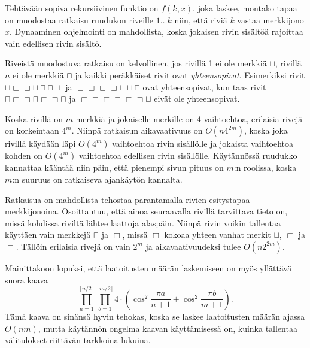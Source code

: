Tehtävään sopiva rekursiivinen funktio on $f(k,x)$,
joka laskee, montako tapaa on muodostaa ratkaisu
ruudukon riveille $1 \ldots k$ niin,
että riviä $k$ vastaa merkkijono $x$.
Dynaaminen ohjelmointi on mahdollista,
koska jokaisen rivin sisältöä
rajoittaa vain edellisen rivin sisältö.

Riveistä muodostuva ratkaisu on kelvollinen,
jos rivillä 1 ei ole merkkiä $\sqcup$,
rivillä $n$ ei ole merkkiä $\sqcap$
ja kaikki peräkkäiset rivit ovat \emph{yhteensopivat}.
Esimerkiksi rivit
$\sqcup \sqsubset \sqsupset \sqcup \sqcap \sqcap \sqcup$ ja
$\sqsubset \sqsupset \sqsubset \sqsupset \sqcup \sqcup \sqcap$ 
ovat yhteensopivat,
kun taas rivit
$\sqcap \sqsubset \sqsupset \sqcap \sqsubset \sqsupset \sqcap$ ja
$\sqsubset \sqsupset \sqsubset \sqsupset \sqsubset \sqsupset \sqcup$
eivät ole yhteensopivat.

Koska rivillä on $m$ merkkiä ja jokaiselle merkille on 4
vaihtoehtoa, erilaisia rivejä on korkeintaan $4^m$.
Niinpä ratkaisun aikavaativuus on $O(n 4^{2m})$,
koska joka rivillä käydään läpi $O(4^m)$
vaihtoehtoa rivin sisällölle
ja jokaista vaihtoehtoa kohden on $O(4^m)$
vaihtoehtoa edellisen rivin sisällölle.
Käytännössä ruudukko kannattaa kääntää niin
päin, että pienempi sivun pituus on $m$:n roolissa,
koska $m$:n suuruus on ratkaiseva ajankäytön kannalta.

Ratkaisua on mahdollista tehostaa parantamalla rivien esitystapaa merkkijonoina.
Osoittautuu, että ainoa seuraavalla rivillä tarvittava tieto on,
missä kohdissa riviltä lähtee laattoja alaspäin.
Niinpä rivin voikin tallentaa käyttäen vain merkkejä
$\sqcap$ ja $\Box$, missä $\Box$ kokoaa yhteen vanhat merkit
$\sqcup$, $\sqsubset$ ja $\sqsupset$.
Tällöin erilaisia rivejä on vain $2^m$
ja aikavaativuudeksi tulee $O(n 2^{2m})$.

Mainittakoon lopuksi, että laatoitusten määrän laskemiseen
on myös yllättävä suora kaava
\[ \prod_{a=1}^{\lceil n/2 \rceil} \prod_{b=1}^{\lceil m/2 \rceil} 4 \cdot (\cos^2 \frac{\pi a}{n + 1} + \cos^2 \frac{\pi b}{m+1}).\]
Tämä kaava on sinänsä hyvin tehokas,
koska se laskee laatoitusten määrän ajassa $O(nm)$,
mutta käytännön ongelma kaavan käyttämisessä
on, kuinka tallentaa välitulokset riittävän tarkkoina lukuina.


